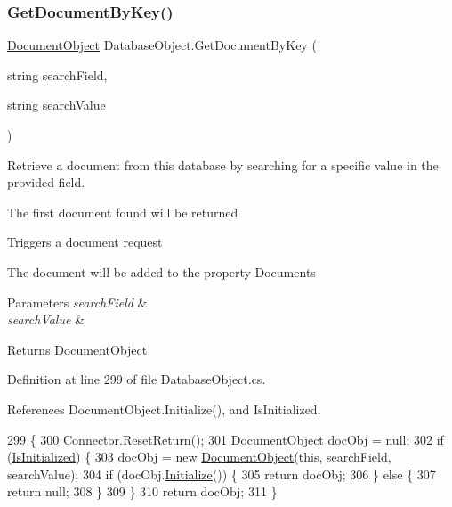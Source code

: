 \subsubsection{\texorpdfstring{Get\+Document\+By\+Key()}{GetDocumentByKey()}}
{\footnotesize\ttfamily \mbox{\hyperlink{class_document_object}{Document\+Object}} Database\+Object.\+Get\+Document\+By\+Key (\begin{DoxyParamCaption}\item[{string}]{search\+Field,  }\item[{string}]{search\+Value }\end{DoxyParamCaption})}



Retrieve a document from this database by searching for a specific value in the provided field. 

The first document found will be returned

Triggers a document request

The document will be added to the property \textquotesingle{}Documents\textquotesingle{}


\begin{DoxyParams}{Parameters}
{\em search\+Field} & \\
\hline
{\em search\+Value} & \\
\hline
\end{DoxyParams}
\begin{DoxyReturn}{Returns}
\mbox{\hyperlink{class_document_object}{Document\+Object}}
\end{DoxyReturn}


Definition at line 299 of file Database\+Object.\+cs.



References Document\+Object.\+Initialize(), and Is\+Initialized.


\begin{DoxyCode}
299                                                                                    \{
300         \mbox{\hyperlink{class_connector}{Connector}}.ResetReturn();
301         \mbox{\hyperlink{class_document_object}{DocumentObject}} docObj = null;
302         \textcolor{keywordflow}{if} (\mbox{\hyperlink{class_database_object_a5fe036d32a30eb10d1b3f6a30263f740}{IsInitialized}}) \{
303             docObj = \textcolor{keyword}{new} \mbox{\hyperlink{class_document_object}{DocumentObject}}(\textcolor{keyword}{this}, searchField, searchValue);
304             \textcolor{keywordflow}{if} (docObj.\mbox{\hyperlink{class_document_object_af4298d6cfbb9ea60643d9995309b73f1}{Initialize}}()) \{
305                 \textcolor{keywordflow}{return} docObj;
306             \} \textcolor{keywordflow}{else} \{
307                 \textcolor{keywordflow}{return} null;
308             \}
309         \}
310         \textcolor{keywordflow}{return} docObj;
311     \}
\end{DoxyCode}
\mbox{\label{class_database_object_a7de43a21bd287deec537cffec343f41d}} 
